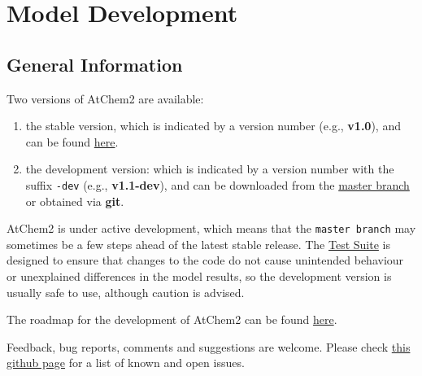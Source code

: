 %
%
%
%

\chapter{Model Development} \label{ch:development}

\section{General Information} \label{sec:general-information}

Two versions of AtChem2 are available:

\begin{enumerate}
\item the stable version, which is indicated by a version number
  (e.g., \textbf{v1.0}), and can be found
  \href{https://github.com/AtChem/AtChem2/releases}{here}.
\item the development version: which is indicated by a version number
  with the suffix \texttt{-dev} (e.g., \textbf{v1.1-dev}), and can be
  downloaded from the
  \href{https://github.com/AtChem/AtChem2/archive/master.zip}{master
    branch} or obtained via \textbf{git}.
\end{enumerate}

AtChem2 is under active development, which means that the
\texttt{master\ branch} may sometimes be a few steps ahead of the
latest stable release. The \hyperref[sec:test-suite]{Test Suite} is
designed to ensure that changes to the code do not cause unintended
behaviour or unexplained differences in the model results, so the
development version is usually safe to use, although caution is
advised.

The roadmap for the development of AtChem2 can be found
\href{https://github.com/AtChem/AtChem2/projects/1}{here}.

Feedback, bug reports, comments and suggestions are welcome. Please
check \href{https://github.com/AtChem/AtChem2/issues}{this github
  page} for a list of known and open issues.

